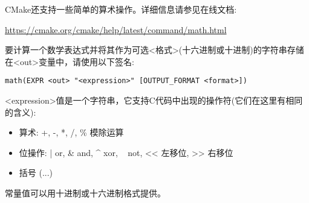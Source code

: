 CMake还支持一些简单的算术操作。详细信息请参见在线文档:

\url{https://cmake.org/cmake/help/latest/command/math.html}

要计算一个数学表达式并将其作为可选<格式>(十六进制或十进制)的字符串存储在<out>变量中，请使用以下签名:

\begin{lstlisting}[style=styleCMake]
math(EXPR <out> "<expression>" [OUTPUT_FORMAT <format>])
\end{lstlisting}

<expression>值是一个字符串，它支持C代码中出现的操作符(它们在这里有相同的含义):

\begin{itemize}
\item 
算术: +, -, *, /, \% 模除运算

\item 
位操作: | or, \& and, \^{} xor, ~ not, <{}< 左移位, >{}> 右移位

\item 
括号 (...)
\end{itemize}

常量值可以用十进制或十六进制格式提供。













